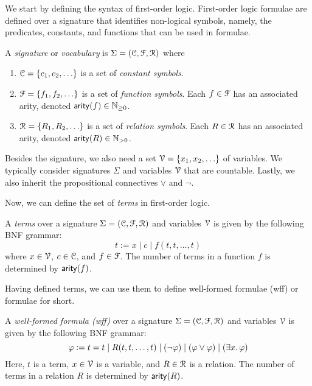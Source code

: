 \documentclass[11pt,usenames, dvipsnames]{article}
\begin{document}
We start by defining the syntax of first-order logic. First-order logic formulae are defined over a signature that identifies non-logical symbols, namely, the predicates, constants, and functions that can be used in formulae.

\begin{definition}[Signature]
  A \emph{signature} or \emph{vocabulary} is $\Sigma = (\conn, \func, \reln)$ where
  \begin{enumerate}
    \item $\conn = \{c_1, c_2, \ldots \}$ is a set of \emph{constant symbols}.
    \item $\func = \{f_1, f_2, \ldots\}$ is a set of \emph{function symbols}. Each $f \in \func$ has an associated arity, denoted $\mathsf{arity}(f) \in \mathbb{N}_{\ge 0}$.
    \item $\reln = \{R_1, R_2, \ldots\}$ is a set of \emph{relation symbols}. Each $R \in \reln$ has an associated arity, denoted $\mathsf{arity}(R) \in \mathbb{N}_{> 0}$.
  \end{enumerate}
\end{definition}

Besides the signature, we also need a set $\vars = \{x_1, x_2, \ldots\}$ of variables. We typically consider signatures $\Sigma$ and variables $\vars$ that are countable. Lastly, we also inherit the propositional connectives $\vee$ and $\neg$.

Now, we can define the set of \emph{terms} in first-order logic.

\begin{definition}[Terms]
  A \emph{terms} over a signature $\Sigma = (\conn, \func, \reln)$ and variables $\vars$ is given by the following BNF grammar:
  $$
  t := x \mid c \mid f(t, t, \ldots, t)
  $$
  where $x \in \vars$, $c \in \conn$, and $f \in \func$. The number of terms in a function $f$ is determined by $\mathsf{arity}(f)$.
\end{definition}

Having defined terms, we can use them to define well-formed formulae (wff) or formulae for short.

\begin{definition}[Formulae]
  A \emph{well-formed formula (wff)} over a signature $\Sigma = (\conn, \func, \reln)$ and variables $\vars$ is given by the following BNF grammar:
  $$
  \varphi := t = t \mid R(t, t, \ldots, t) \mid (\neg \varphi) \mid (\varphi \vee \varphi) \mid (\exists x \ldotp \varphi)
  $$
  Here, $t$ is a term, $x \in \vars$ is a variable, and $R \in \reln$ is a relation. The number of terms in a relation $R$ is determined by $\mathsf{arity}(R)$.
\end{definition}
\end{document}
